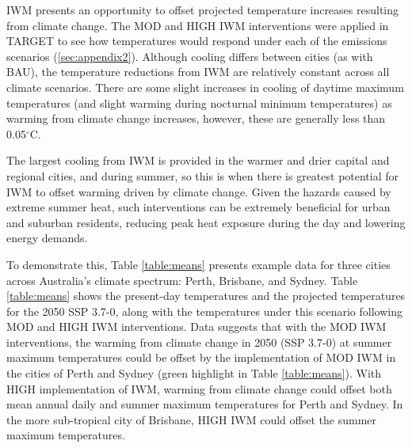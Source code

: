 \documentclass[utf8]{frontiersSCNS} %
\begin{document}
IWM presents an opportunity to offset projected temperature increases resulting from climate change. The MOD and HIGH IWM interventions were applied in TARGET to see how temperatures would respond under each of the emissions scenarios (\ref{sec:appendix2}). Although cooling differs between cities (as with BAU), the temperature reductions from IWM are relatively constant across all climate scenarios. There are some slight increases in cooling of daytime maximum temperatures (and slight warming during nocturnal minimum temperatures) as warming from climate change increases, however, these are generally less than 0.05$^{\circ}$C.

The largest cooling from IWM is provided in the warmer and drier capital and regional cities, and during summer, so this is when there is greatest potential for IWM to offset warming driven by climate change. Given the hazards caused by extreme summer heat, such interventions can be extremely beneficial for urban and suburban residents, reducing peak heat exposure during the day and lowering energy demands. 

To demonstrate this, Table \ref{table:means} presents example data for three cities across Australia’s climate spectrum: Perth, Brisbane, and Sydney. Table \ref{table:means} shows the present-day temperatures and the projected temperatures for the 2050 SSP 3.7-0, along with the temperatures under this scenario following MOD and HIGH IWM interventions. Data suggests that with the MOD IWM interventions, the warming from climate change in 2050 (SSP 3.7-0) at summer maximum temperatures could be offset by the implementation of MOD IWM in the cities of Perth and Sydney (green highlight in Table \ref{table:means}). With HIGH implementation of IWM, warming from climate change could offset both mean annual daily and summer maximum temperatures for Perth and Sydney. In the more sub-tropical city of Brisbane, HIGH IWM could offset the summer maximum temperatures.
\end{document}
